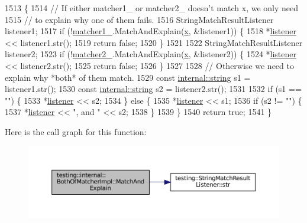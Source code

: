 \begin{DoxyCode}
1513                                                                          \{
1514     \textcolor{comment}{// If either matcher1\_ or matcher2\_ doesn't match x, we only need}
1515     \textcolor{comment}{// to explain why one of them fails.}
1516     StringMatchResultListener listener1;
1517     \textcolor{keywordflow}{if} (!\hyperlink{classtesting_1_1internal_1_1BothOfMatcherImpl_a31f8739f880776e209a3e5bd96ddfbf6}{matcher1\_}.MatchAndExplain(\hyperlink{namespaceinteractive__marker_acda52804aef30b460a72fb21ee01d69d}{x}, &listener1)) \{
1518       *\hyperlink{namespaceinteractive__marker_a0e579ab555212bb5e2c9f8a675b7618a}{listener} << listener1.str();
1519       \textcolor{keywordflow}{return} \textcolor{keyword}{false};
1520     \}
1521 
1522     StringMatchResultListener listener2;
1523     \textcolor{keywordflow}{if} (!\hyperlink{classtesting_1_1internal_1_1BothOfMatcherImpl_aeb19d68ac4732ad2ca45a9d37ad955cb}{matcher2\_}.MatchAndExplain(\hyperlink{namespaceinteractive__marker_acda52804aef30b460a72fb21ee01d69d}{x}, &listener2)) \{
1524       *\hyperlink{namespaceinteractive__marker_a0e579ab555212bb5e2c9f8a675b7618a}{listener} << listener2.str();
1525       \textcolor{keywordflow}{return} \textcolor{keyword}{false};
1526     \}
1527 
1528     \textcolor{comment}{// Otherwise we need to explain why *both* of them match.}
1529     \textcolor{keyword}{const} \hyperlink{namespacetesting_1_1internal_a8e8ff5b11e64078831112677156cb111}{internal::string} s1 = listener1.str();
1530     \textcolor{keyword}{const} \hyperlink{namespacetesting_1_1internal_a8e8ff5b11e64078831112677156cb111}{internal::string} s2 = listener2.str();
1531 
1532     \textcolor{keywordflow}{if} (s1 == \textcolor{stringliteral}{""}) \{
1533       *\hyperlink{namespaceinteractive__marker_a0e579ab555212bb5e2c9f8a675b7618a}{listener} << s2;
1534     \} \textcolor{keywordflow}{else} \{
1535       *\hyperlink{namespaceinteractive__marker_a0e579ab555212bb5e2c9f8a675b7618a}{listener} << s1;
1536       \textcolor{keywordflow}{if} (s2 != \textcolor{stringliteral}{""}) \{
1537         *\hyperlink{namespaceinteractive__marker_a0e579ab555212bb5e2c9f8a675b7618a}{listener} << \textcolor{stringliteral}{", and "} << s2;
1538       \}
1539     \}
1540     \textcolor{keywordflow}{return} \textcolor{keyword}{true};
1541   \}
\end{DoxyCode}
Here is the call graph for this function\+:
\nopagebreak
\begin{figure}[H]
\begin{center}
\leavevmode
\includegraphics[width=350pt]{classtesting_1_1internal_1_1BothOfMatcherImpl_a4f3e5edf69d168fef8bec577313748f4_cgraph}
\end{center}
\end{figure}


